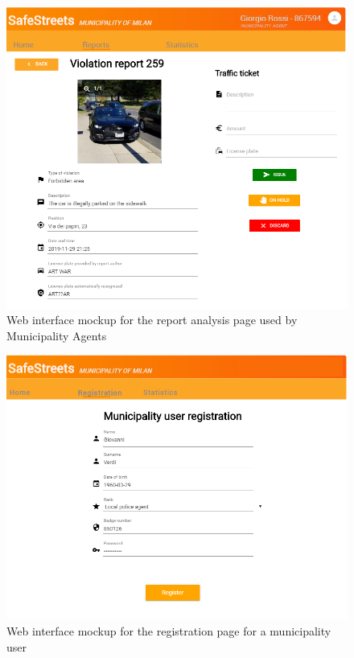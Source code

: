 \documentclass[a4paper]{report}
\begin{document}
{\begin{figure}[htp]
\centering
\includegraphics[width= \textwidth]{mockups/reportAnalysis.png}
\caption[Web mockup for the report analysis page]{Web interface mockup for the report analysis page used by Municipality Agents}
\label{fig:mock-reportanalysis}
\end{figure}
\begin{figure}[htp]
\centering
\includegraphics[width= \textwidth]{mockups/municipalityRegistrationMockup.png}
\caption[Web mockup for registration page]{Web interface mockup for the registration page for a municipality user}
\label{fig:mock-webregister}
\end{figure}
}
\end{document}
